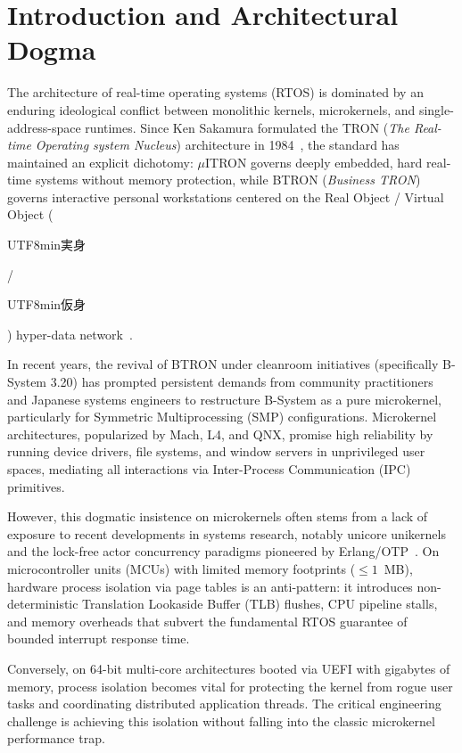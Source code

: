 \documentclass[10pt,journal,compsoc,twocolumn]{article}
\newcommand{\ja}[1]{\begin{CJK*}{UTF8}{min}#1\end{CJK*}}
\begin{document}
\section{Introduction and Architectural Dogma}
\label{sec:intro}

The architecture of real-time operating systems (RTOS) is dominated by an enduring ideological conflict between monolithic kernels, microkernels, and single-address-space runtimes. Since Ken Sakamura formulated the TRON (\emph{The Real-time Operating system Nucleus}) architecture in 1984~\cite{sakamura1984tron}, the standard has maintained an explicit dichotomy: $\mu$ITRON governs deeply embedded, hard real-time systems without memory protection, while BTRON (\emph{Business TRON}) governs interactive personal workstations centered on the Real Object / Virtual Object (\ja{実身}/\ja{仮身}) hyper-data network~\cite{btron3spec}.

In recent years, the revival of BTRON under cleanroom initiatives (specifically B-System 3.20) has prompted persistent demands from community practitioners and Japanese systems engineers to restructure B-System as a pure microkernel, particularly for Symmetric Multiprocessing (SMP) configurations. Microkernel architectures, popularized by Mach, L4, and QNX, promise high reliability by running device drivers, file systems, and window servers in unprivileged user spaces, mediating all interactions via Inter-Process Communication (IPC) primitives.

However, this dogmatic insistence on microkernels often stems from a lack of exposure to recent developments in systems research, notably unicore unikernels and the lock-free actor concurrency paradigms pioneered by Erlang/OTP~\cite{armstrong2003erlang}. On microcontroller units (MCUs) with limited memory footprints ($\le 1$~MB), hardware process isolation via page tables is an anti-pattern: it introduces non-deterministic Translation Lookaside Buffer (TLB) flushes, CPU pipeline stalls, and memory overheads that subvert the fundamental RTOS guarantee of bounded interrupt response time.

Conversely, on 64-bit multi-core architectures booted via UEFI with gigabytes of memory, process isolation becomes vital for protecting the kernel from rogue user tasks and coordinating distributed application threads. The critical engineering challenge is achieving this isolation without falling into the classic microkernel performance trap.
\end{document}
